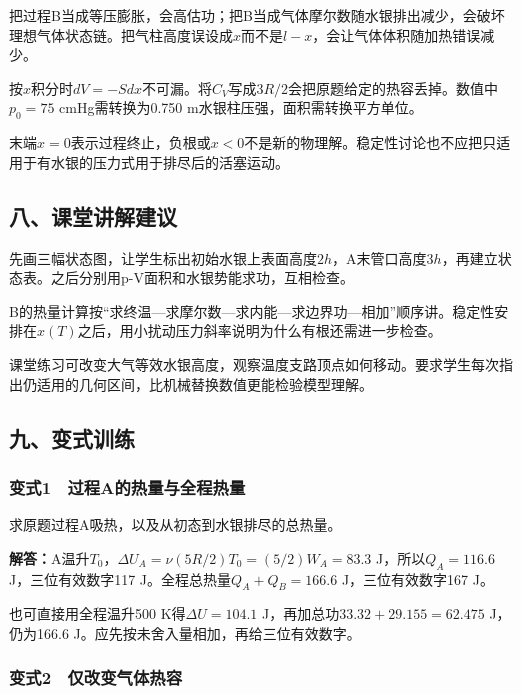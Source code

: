 \documentclass[12pt,a4paper,fontset=fandol]{ctexart}
\begin{document}
把过程B当成等压膨胀，会高估功；把B当成气体摩尔数随水银排出减少，会破坏理想气体状态链。把气柱高度误设成\(x\)而不是\(l-x\)，会让气体体积随加热错误减少。

按\(x\)积分时\(dV=-Sdx\)不可漏。将\(C_V\)写成\(3R/2\)会把原题给定的热容丢掉。数值中\(p_0=75\)
cmHg需转换为0.750 m水银柱压强，面积需转换平方单位。

末端\(x=0\)表示过程终止，负根或\(x<0\)不是新的物理解。稳定性讨论也不应把只适用于有水银的压力式用于排尽后的活塞运动。

\subsection{八、课堂讲解建议}\label{ux516bux8bfeux5802ux8bb2ux89e3ux5efaux8bae-1}

先画三幅状态图，让学生标出初始水银上表面高度\(2h\)，A末管口高度\(3h\)，再建立状态表。之后分别用p-V面积和水银势能求功，互相检查。

B的热量计算按``求终温---求摩尔数---求内能---求边界功---相加''顺序讲。稳定性安排在\(x(T)\)之后，用小扰动压力斜率说明为什么有根还需进一步检查。

课堂练习可改变大气等效水银高度，观察温度支路顶点如何移动。要求学生每次指出仍适用的几何区间，比机械替换数值更能检验模型理解。

\subsection{九、变式训练}\label{ux4e5dux53d8ux5f0fux8badux7ec3-1}

\subsubsection{变式1　过程A的热量与全程热量}\label{ux53d8ux5f0f1-ux8fc7ux7a0baux7684ux70edux91cfux4e0eux5168ux7a0bux70edux91cf}

求原题过程A吸热，以及从初态到水银排尽的总热量。

\textbf{解答：}A温升\(T_0\)，\(\Delta U_A=\nu(5R/2)T_0=(5/2)W_A=83.3\)
J，所以\(Q_A=116.6\) J，三位有效数字117 J。全程总热量\(Q_A+Q_B=166.6\)
J，三位有效数字167 J。

也可直接用全程温升500 K得\(\Delta U=104.1\)
J，再加总功\(33.32+29.155=62.475\) J，仍为166.6
J。应先按未舍入量相加，再给三位有效数字。

\subsubsection{变式2　仅改变气体热容}\label{ux53d8ux5f0f2-ux4ec5ux6539ux53d8ux6c14ux4f53ux70edux5bb9}
\end{document}
